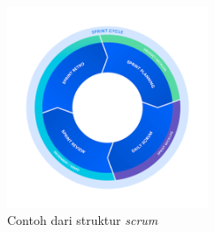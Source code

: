 \documentclass[a4paper]{article}
\begin{document}
\begin{figure}[h]
    \centering
    \includegraphics[width=6cm]{images/sprint_cycle-c.png}
    \caption{Contoh dari struktur \textit{scrum}\autocite{atlassian-agile-scrum}}
    \label{fig:strukturagile}
\end{figure}
\end{document}
